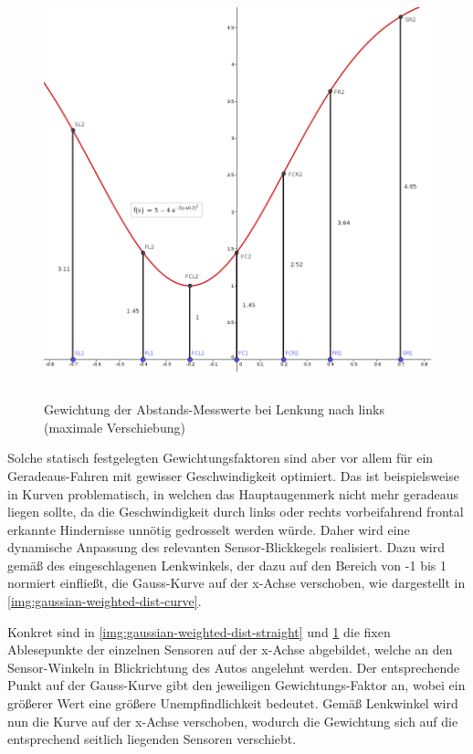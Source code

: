 \documentclass[12pt, a4paper]{scrartcl}
\begin{document}
\begin{figure}[!ht]
	\centering
	\includegraphics[width=\textwidth, height=12cm, keepaspectratio]{Bilder/Gauss_Sensorgewichtung_geneigt.png}
	\caption{Gewichtung der Abstands-Messwerte bei Lenkung nach links (maximale Verschiebung)}
	\label{img:gaussian-weighted-dist-curve}
\end{figure}

Solche statisch festgelegten Gewichtungsfaktoren sind aber vor allem für ein Geradeaus-Fahren mit gewisser Geschwindigkeit optimiert. Das ist beispielsweise in Kurven problematisch, in welchen das Hauptaugenmerk nicht mehr geradeaus liegen sollte, da die Geschwindigkeit durch links oder rechts vorbeifahrend frontal erkannte Hindernisse unnötig gedrosselt werden würde. Daher wird eine dynamische Anpassung des relevanten Sensor-Blickkegels realisiert. Dazu wird gemäß des eingeschlagenen Lenkwinkels, der dazu auf den Bereich von -1 bis 1 normiert einfließt, die Gauss-Kurve auf der x-Achse verschoben, wie dargestellt in \autoref{img:gaussian-weighted-dist-curve}.

Konkret sind in \autoref{img:gaussian-weighted-dist-straight} und \ref{img:gaussian-weighted-dist-curve} die fixen Ablesepunkte der einzelnen Sensoren auf der x-Achse abgebildet, welche an den Sensor-Winkeln in Blickrichtung des Autos angelehnt werden. Der entsprechende Punkt auf der Gauss-Kurve gibt den jeweiligen Gewichtungs-Faktor an, wobei ein größerer Wert eine größere Unempfindlichkeit bedeutet. Gemäß Lenkwinkel wird nun die Kurve auf der x-Achse verschoben, wodurch die Gewichtung sich auf die entsprechend seitlich liegenden Sensoren verschiebt.
\end{document}
